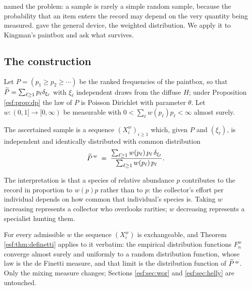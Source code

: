 \citet{esf:fisher1934} named the problem: a sample is rarely a simple random sample, because
the probability that an item enters the record may depend on the very quantity being
measured. \citet{esf:rao1965} gave the general device, the weighted distribution. We apply it
to Kingman's paintbox and ask what survives.

\subsection{The construction}

Let $P = (p_1 \ge p_2 \ge \cdots)$ be the ranked frequencies of the paintbox, so that
$\widetilde{P} = \sum_{\ell \ge 1} p_\ell \delta_{\xi_\ell}$ with $\xi_\ell$ independent draws
from the diffuse $H$; under Proposition \ref{esf:prop:dp} the law of $P$ is Poisson
Dirichlet with parameter $\theta$. Let $w : (0,1] \to [0,\infty)$ be measurable with
$0 < \sum_\ell w(p_\ell) p_\ell < \infty$ almost surely.

\begin{definition}
The ascertained sample is a sequence $(X_i^w)_{i \ge 1}$ which, given $P$ and
$(\xi_\ell)$, is independent and identically distributed with common distribution
\begin{equation}
\widetilde{P}^{\, w} \; = \; \frac{\sum_{\ell \ge 1} w(p_\ell) \, p_\ell \, \delta_{\xi_\ell}}
{\sum_{\ell \ge 1} w(p_\ell) \, p_\ell } .
\label{esf:eq:weighted}
\end{equation}
\end{definition}

The interpretation is that a species of relative abundance $p$ contributes to the
record in proportion to $w(p) p$ rather than to $p$: the collector's effort per
individual depends on how common that individual's species is. Taking $w$ increasing
represents a collector who overlooks rarities; $w$ decreasing represents a specialist
hunting them.

\begin{proposition}
\label{esf:prop:invariant}
For every admissible $w$ the sequence $(X_i^w)$ is exchangeable, and Theorem
\ref{esf:thm:definetti} applies to it verbatim: the empirical distribution functions
$F_n^w$ converge almost surely and uniformly to a random distribution function, whose
law is the de Finetti measure, and that limit is the distribution function of
$\widetilde{P}^{\, w}$. Only the mixing measure changes; Sections \ref{esf:sec:wor} and
\ref{esf:sec:helly} are untouched.
\end{proposition}

